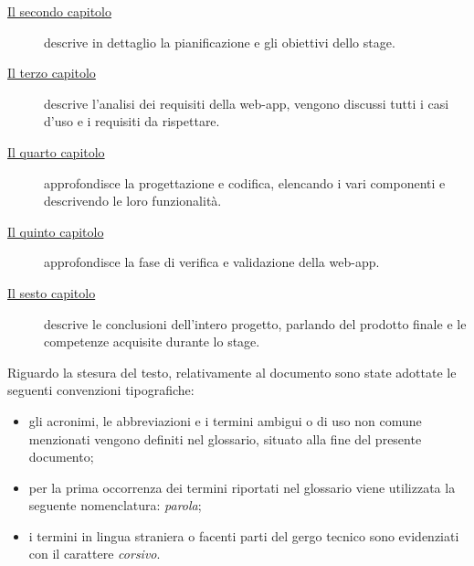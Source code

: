 \begin{description}
    \item[{\hyperref[cap:il progetto di stage]{Il secondo capitolo}}] descrive in dettaglio la pianificazione e gli obiettivi dello stage.
    
    \item[{\hyperref[cap:analisi dei requisiti]{Il terzo capitolo}}] descrive l'analisi dei requisiti della web-app, vengono discussi tutti i casi d'uso e i requisiti da rispettare.
    
    \item[{\hyperref[cap:progettazione e codifica]{Il quarto capitolo}}] approfondisce la progettazione e codifica, elencando i vari componenti e descrivendo le loro funzionalità.
    
    
    \item[{\hyperref[cap:verifica]{Il quinto capitolo}}] approfondisce la fase di verifica e validazione della web-app.
    
    \item[{\hyperref[cap:conclusioni]{Il sesto capitolo}}] descrive le conclusioni dell'intero progetto, parlando del prodotto finale e le competenze acquisite durante lo stage.
\end{description}
Riguardo la stesura del testo, relativamente al documento sono state adottate le seguenti convenzioni tipografiche:
\begin{itemize}
	\item gli acronimi, le abbreviazioni e i termini ambigui o di uso non comune menzionati vengono definiti nel glossario, situato alla fine del presente documento;
	\item per la prima occorrenza dei termini riportati nel glossario viene utilizzata la seguente nomenclatura: \emph{parola}\glsfirstoccur;
	\item i termini in lingua straniera o facenti parti del gergo tecnico sono evidenziati con il carattere \emph{corsivo}.
\end{itemize}